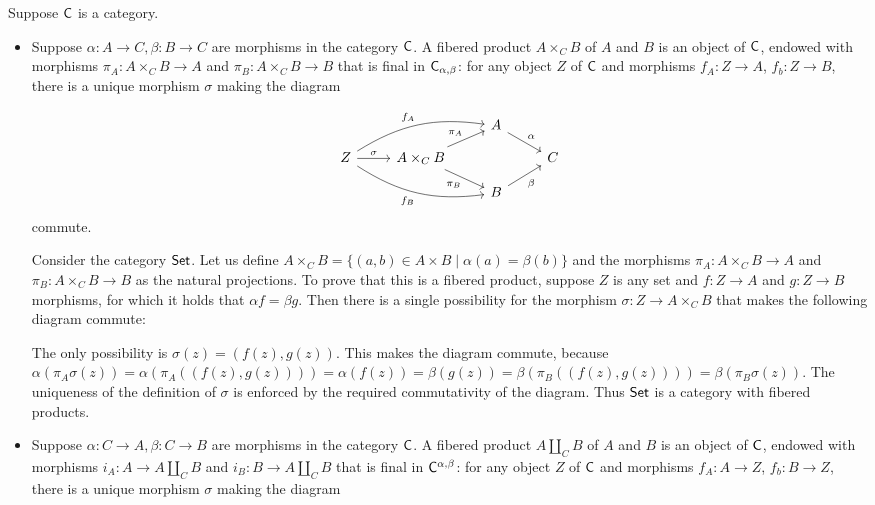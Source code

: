 \begin{solution}
	Suppose $\mathsf{C}$ is a category.
	\begin{itemize}
		\item Suppose $\alpha: A \to C, \beta: B \to C$ are morphisms in the category $\mathsf{C}$. A fibered product $A \times_C B$ of $A$ and $B$ is an object of $\mathsf{C}$, endowed with morphisms $\pi_A : A \times_C B \to A$ and $\pi_B: A \times_C B \to B$ that is final in $\mathsf{C}_{\alpha,\beta}$: for any object $Z$ of $\mathsf{C}$ and morphisms $f_A: Z \to A$, $f_b: Z \to B$, there is a unique morphism $\sigma$ making the diagram
		
		\begin{equation*}
			\begin{tikzcd}[row sep=small]
				& & A \arrow[dr, "\alpha"] &\\
				Z
				\arrow[r, "\sigma"]
				\arrow[urr, bend left=20, "f_A"]
				\arrow[drr, bend right=20, "f_B"']
				& A \times_C B
				\arrow[ur, "\pi_A"]
				\arrow[dr, "\pi_B"']
				& & C\\
				& & B \arrow[ur, "\beta"'] &
			\end{tikzcd}
		\end{equation*} commute.
		
		Consider the category $\mathsf{Set}$. Let us define $A \times_C B = \{(a, b) \in A \times B \mid \alpha(a) = \beta(b)\}$ and the morphisms $\pi_A: A \times_C B \to A$ and $\pi_B: A \times_C B \to B$ as the natural projections. To prove that this is a fibered product, suppose $Z$ is any set and $f: Z \to A$ and $g: Z \to B$ morphisms, for which it holds that $\alpha f = \beta g$. Then there is a single possibility for the morphism $\sigma: Z \to A \times_C B$ that makes the following diagram commute:
		
		The only possibility is $\sigma(z) = (f(z),g(z))$. This makes the diagram commute, because $\alpha(\pi_A\sigma(z))=\alpha(\pi_A((f(z),g(z))))=\alpha(f(z))=\beta(g(z))=\beta(\pi_B((f(z), g(z))))=\beta(\pi_B\sigma(z))$. The uniqueness of the definition of $\sigma$ is enforced by the required commutativity of the diagram. Thus $\mathsf{Set}$ is a category with fibered products.
		
		\item Suppose $\alpha: C \to A, \beta: C \to B$ are morphisms in the category $\mathsf{C}$.  A fibered product $A \amalg_C B$ of $A$ and $B$ is an object of $\mathsf{C}$, endowed with morphisms $i_A : A \to A \amalg_C B$ and $i_B: B \to A \amalg_C B$ that is final in $\mathsf{C}^{\alpha,\beta}$: for any object $Z$ of $\mathsf{C}$ and morphisms $f_A: A \to Z$, $f_b: B \to Z$, there is a unique morphism $\sigma$ making the diagram
		

\end{itemize}
\end{solution}
